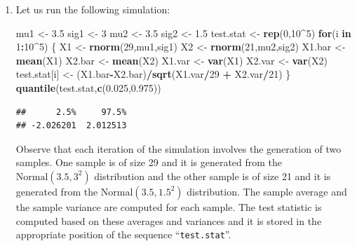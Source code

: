 \documentclass[
]{krantz}
\makeatletter
\newenvironment{Shaded}{\begin{snugshade}}{\end{snugshade}}
\newcommand{\ControlFlowTok}[1]{\textcolor[rgb]{0.13,0.29,0.53}{\textbf{#1}}}
\newcommand{\DecValTok}[1]{\textcolor[rgb]{0.00,0.00,0.81}{#1}}
\newcommand{\FloatTok}[1]{\textcolor[rgb]{0.00,0.00,0.81}{#1}}
\newcommand{\KeywordTok}[1]{\textcolor[rgb]{0.13,0.29,0.53}{\textbf{#1}}}
\newcommand{\NormalTok}[1]{#1}
\newcommand{\OperatorTok}[1]{\textcolor[rgb]{0.81,0.36,0.00}{\textbf{#1}}}
\newcommand{\StringTok}[1]{\textcolor[rgb]{0.31,0.60,0.02}{#1}}
\newenvironment{kframe}{%
\medskip{}
\setlength{\fboxsep}{.8em}
 \def\at@end@of@kframe{}%
 \ifinner\ifhmode%
  \def\at@end@of@kframe{\end{minipage}}%
  \begin{minipage}{\columnwidth}%
 \fi\fi%
 \def\FrameCommand##1{\hskip\@totalleftmargin \hskip-\fboxsep
 \colorbox{shadecolor}{##1}\hskip-\fboxsep
     \hskip-\linewidth \hskip-\@totalleftmargin \hskip\columnwidth}%
 \MakeFramed {\advance\hsize-\width
   \@totalleftmargin\z@ \linewidth\hsize
   \@setminipage}}%
 {\par\unskip\endMakeFramed%
 \at@end@of@kframe}
\renewenvironment{Shaded}{\begin{kframe}}{\end{kframe}}
\theoremstyle{definition}
\theoremstyle{definition}
\theoremstyle{definition}
\theoremstyle{remark}
\makeatother
\begin{document}
\begin{enumerate}
\def\labelenumi{\arabic{enumi}.}
\item
  Let us run the following
  simulation:

\begin{Shaded}
\begin{Highlighting}[]
\NormalTok{mu1 <-}\StringTok{ }\FloatTok{3.5}
\NormalTok{sig1 <-}\StringTok{ }\DecValTok{3}
\NormalTok{mu2 <-}\StringTok{ }\FloatTok{3.5}
\NormalTok{sig2 <-}\StringTok{ }\FloatTok{1.5}
\NormalTok{test.stat <-}\StringTok{ }\KeywordTok{rep}\NormalTok{(}\DecValTok{0}\NormalTok{,}\DecValTok{10}\OperatorTok{^}\DecValTok{5}\NormalTok{)}
\ControlFlowTok{for}\NormalTok{(i }\ControlFlowTok{in} \DecValTok{1}\OperatorTok{:}\DecValTok{10}\OperatorTok{^}\DecValTok{5}\NormalTok{) \{}
\NormalTok{  X1 <-}\StringTok{ }\KeywordTok{rnorm}\NormalTok{(}\DecValTok{29}\NormalTok{,mu1,sig1)}
\NormalTok{  X2 <-}\StringTok{ }\KeywordTok{rnorm}\NormalTok{(}\DecValTok{21}\NormalTok{,mu2,sig2)}
\NormalTok{  X1.bar <-}\StringTok{ }\KeywordTok{mean}\NormalTok{(X1)}
\NormalTok{  X2.bar <-}\StringTok{ }\KeywordTok{mean}\NormalTok{(X2)}
\NormalTok{  X1.var <-}\StringTok{ }\KeywordTok{var}\NormalTok{(X1)}
\NormalTok{  X2.var <-}\StringTok{ }\KeywordTok{var}\NormalTok{(X2)}
\NormalTok{  test.stat[i] <-}\StringTok{ }\NormalTok{(X1.bar}\OperatorTok{-}\NormalTok{X2.bar)}\OperatorTok{/}\KeywordTok{sqrt}\NormalTok{(X1.var}\OperatorTok{/}\DecValTok{29} \OperatorTok{+}\StringTok{ }\NormalTok{X2.var}\OperatorTok{/}\DecValTok{21}\NormalTok{)}
\NormalTok{\}}
\KeywordTok{quantile}\NormalTok{(test.stat,}\KeywordTok{c}\NormalTok{(}\FloatTok{0.025}\NormalTok{,}\FloatTok{0.975}\NormalTok{))}
\end{Highlighting}
\end{Shaded}

\begin{verbatim}
##      2.5%     97.5% 
## -2.026201  2.012513
\end{verbatim}

  Observe that each iteration of the simulation involves the generation of
  two samples. One sample is of size 29 and it is generated from the
  \(\mathrm{Normal}(3.5,3^2)\) distribution and the other sample is of size
  21 and it is generated from the \(\mathrm{Normal}(3.5,1.5^2)\)
  distribution. The sample average and the sample variance are computed
  for each sample. The test statistic is computed based on these averages
  and variances and it is stored in the appropriate position of the
  sequence ``\texttt{test.stat}''.


\end{enumerate}
\end{document}
